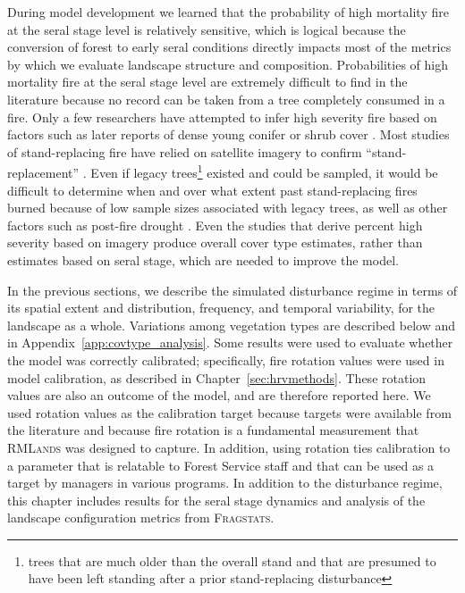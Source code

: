 During model development we learned that the probability of high mortality fire at the seral stage level is relatively sensitive, which is logical because the conversion of forest to early seral conditions directly impacts most of the metrics by which we evaluate landscape structure and composition. Probabilities of high mortality fire at the seral stage level are extremely difficult to find in the literature because no record can be taken from a tree completely consumed in a fire. Only a few researchers have attempted to infer high severity fire based on factors such as later reports of dense young conifer or shrub cover \citep{Baker2014}. Most studies of stand-replacing fire have relied on satellite imagery to confirm ``stand-replacement'' \citep[e.g.,][]{Collins2010,Mallek2013}. Even if legacy trees\footnote{trees that are much older than the overall stand and that are presumed to have been left standing after a prior stand-replacing disturbance} existed and could be sampled, it would be difficult to determine when and over what extent past stand-replacing fires burned because of low sample sizes associated with legacy trees, as well as other factors such as post-fire drought \citep{Minnich2000,Baker2014}. Even the studies that derive percent high severity based on imagery produce overall cover type estimates, rather than estimates based on seral stage, which are needed to improve the model.

In the previous sections, we describe the simulated disturbance regime in terms of its spatial extent and distribution, frequency, and temporal variability, for the landscape as a whole. Variations among vegetation types are described below and in Appendix~\ref{app:covtype_analysis}. Some results were used to evaluate whether the model was correctly calibrated; specifically, fire rotation values were used in model calibration, as described in Chapter~\ref{sec:hrvmethods}. These rotation values are also an outcome of the model, and are therefore reported here. We used rotation values as the calibration target because targets were available from the literature and because fire rotation is a fundamental measurement that \textsc{RMLands} was designed to capture. In addition, using rotation ties calibration to a parameter that is relatable to Forest Service staff and that can be used as a target by managers in various programs. In addition to the disturbance regime, this chapter includes results for the seral stage dynamics and analysis of the landscape configuration metrics from \textsc{Fragstats}.

